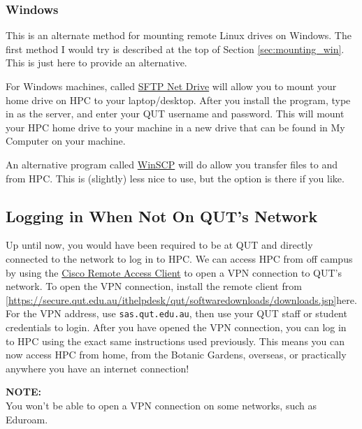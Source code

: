 \subsubsection{Windows}
This is an alternate method for mounting remote Linux drives on Windows. The first method I would try is described at the top of Section \ref{sec:mounting_win}. This is just here to provide an alternative.
%
%
\par
%
%
For Windows machines, called \href{https://www.nsoftware.com/netdrive/sftp/}{SFTP Net Drive} will allow you to mount your home drive on HPC to your laptop/desktop. After you install the program, type in  as the server, and enter your QUT username and password. This will mount your HPC home drive to your machine in a new drive that can be found in My Computer on your machine.
%
\par
%
An alternative program called \href{https://winscp.net/eng/download.php}{WinSCP} will do allow you transfer files to and from HPC. This is (slightly) less nice to use, but the option is there if you like.
%
%
\subsection{Logging in When Not On QUT's Network}
%
%
Up until now, you would have been required to be at QUT and directly connected to the network to log in to HPC. We can access HPC from off campus by using the \href{https://secure.qut.edu.au/ithelpdesk/qut/softwaredownloads/downloads.jsp}{Cisco Remote Access Client} to open a VPN connection to QUT's network. To open the VPN connection, install the remote client from \ref{https://secure.qut.edu.au/ithelpdesk/qut/softwaredownloads/downloads.jsp}{here}. For the VPN address, use \texttt{sas.qut.edu.au}, then use your QUT staff or student credentials to login. After you have opened the VPN connection, you can log in to HPC using the exact same instructions used previously. This means you can now access HPC from home, from the Botanic Gardens, overseas, or practically anywhere you have an internet connection!
%
%
\par
\begin{story}
  \textbf{NOTE:}
  \\
  You won't be able to open a VPN connection on some networks, such as Eduroam.
\end{story}

